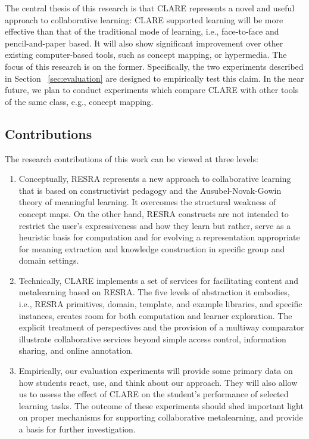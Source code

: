 The central thesis of this research is that CLARE represents a novel and
useful approach to collaborative learning: CLARE supported learning will be
more effective than that of the traditional mode of learning, i.e.,
face-to-face and pencil-and-paper based. It will also show significant
improvement over other existing computer-based tools, such as concept
mapping, or hypermedia. The focus of this research is on the former.
Specifically, the two experiments described in Section
~\ref{sec:evaluation} are designed to empirically test this claim. In the
near future, we plan to conduct experiments which compare CLARE with other
tools of the same class, e.g., concept mapping.

\subsection{Contributions}
\label{sec:contributions}

The research contributions of this work can be viewed at three levels:

\begin{enumerate}
\item Conceptually, RESRA represents a new approach to collaborative
  learning that is based on constructivist pedagogy and the
  Ausubel-Novak-Gowin theory of meaningful learning. It overcomes the
  structural weakness of concept maps. On the other hand, RESRA constructs
  are not intended to restrict the user's expressiveness and how they learn
  but rather, serve as a heuristic basis for computation and for evolving a
  representation appropriate for meaning extraction and knowledge
  construction in specific group and domain settings.
  
\item Technically, CLARE implements a set of services for facilitating
  content and metalearning based on RESRA. The five levels of abstraction it
  embodies, i.e., RESRA primitives, domain, template, and example libraries,
  and specific instances, creates room for both computation and learner
  exploration. The explicit treatment of perspectives and the provision of a
  multiway comparator illustrate collaborative services beyond simple access
  control, information sharing, and online annotation.
  
\item Empirically, our evaluation experiments will provide some primary
  data on how students react, use, and think about our approach. They will
  also allow us to assess the effect of CLARE on the student's performance
  of selected learning tasks. The outcome of these experiments should shed
  important light on proper mechanisms for supporting collaborative
  metalearning, and provide a basis for further investigation.
\end{enumerate}

